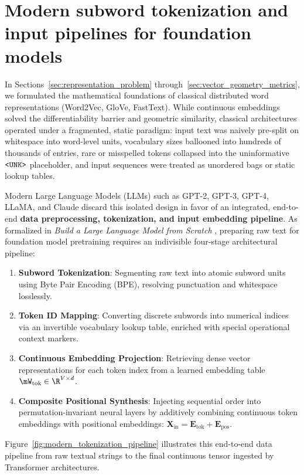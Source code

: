 \documentclass[../../main.tex]{subfiles}
\begin{document}
\section{Modern subword tokenization and input pipelines for foundation models}
\label{sec:modern_tokenization_pipeline}

In Sections~\ref{sec:representation_problem} through~\ref{sec:vector_geometry_metrics}, we formulated the mathematical foundations of classical distributed word representations (Word2Vec, GloVe, FastText). While continuous embeddings solved the differentiability barrier and geometric similarity, classical architectures operated under a fragmented, static paradigm: input text was naively pre-split on whitespace into word-level units, vocabulary sizes ballooned into hundreds of thousands of entries, rare or misspelled tokens collapsed into the uninformative $\text{\texttt{<UNK>}}$ placeholder, and input sequences were treated as unordered bags or static lookup tables.

Modern Large Language Models (LLMs) such as GPT-2, GPT-3, GPT-4, LLaMA, and Claude discard this isolated design in favor of an integrated, end-to-end \textbf{data preprocessing, tokenization, and input embedding pipeline}. As formalized in \emph{Build a Large Language Model from Scratch} \cite{raschka2024llm}, preparing raw text for foundation model pretraining requires an indivisible four-stage architectural pipeline:
\begin{enumerate}
    \item \textbf{Subword Tokenization}: Segmenting raw text into atomic subword units using Byte Pair Encoding (BPE), resolving punctuation and whitespace losslessly.
    \item \textbf{Token ID Mapping}: Converting discrete subwords into numerical indices via an invertible vocabulary lookup table, enriched with special operational context markers.
    \item \textbf{Continuous Embedding Projection}: Retrieving dense vector representations for each token index from a learned embedding table $\mW_{\text{tok}} \in \R^{V \times d}$.
    \item \textbf{Composite Positional Synthesis}: Injecting sequential order into permutation-invariant neural layers by additively combining continuous token embeddings with positional embeddings: $\mathbf{X}_{\text{in}} = \mathbf{E}_{\text{tok}} + \mathbf{E}_{\text{pos}}$.
\end{enumerate}

Figure~\ref{fig:modern_tokenization_pipeline} illustrates this end-to-end data pipeline from raw textual strings to the final continuous tensor ingested by Transformer architectures.
\end{document}
